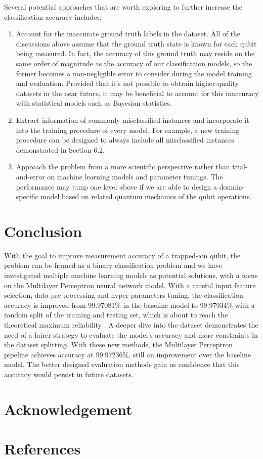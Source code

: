 \documentclass[letterpaper,twocolumn,10pt]{article}
\begin{document}
Several potential approaches that are worth exploring to further increase the classification accuracy includes:

\begin{enumerate}
    \item 
    Account for the inaccurate ground truth labels in the dataset. All of the discussions above assume that the ground truth state is known for each qubit being measured. In fact, the accuracy of this ground truth may reside on the same order of magnitude as the accuracy of our classification models, so the former becomes a non-negligible error to consider during the model training and evaluation. Provided that it's not possible to obtrain higher-quality datasets in the near future, it may be beneficial to account for this inaccuracy with statistical models such as Bayesian statistics. 

    \item 
    Extract information of commonly misclassified instances and incorporate it into the training procedure of every model. For example, a new training procedure can be designed to always include all misclassified instances demonstrated in Section 6.2.

    \item 
    Approach the problem from a more scientific perspective rather than trial-and-error on machine learning models and parameter tunings. The performance may jump one level above if we are able to design a domain-specific model based on related quantum mechanics of the qubit operations.

\end{enumerate}

\section{Conclusion}

With the goal to improve measurement accuracy of a trapped-ion qubit, the problem can be framed as a binary classification problem and we have investigated multiple machine learning models as potential solutions, with a focus on the Multilayer Perceptron neural network model. With a careful input feature selection, data pre-processing and hyper-parameters tuning, the classification accuracy is improved from 99.97081\% in the baseline model to 99.97934\% with a random split of the training and testing set, which is about to reach the theoretical maximum reliability . A deeper dive into the dataset demonstrates the need of a fairer strategy to evaluate the model's accuracy and more constraints in the dataset splitting. With these new methods, the Multilayer Perceptron pipeline achieves accuracy at 99.97236\%, still an improvement over the baseline model. The better designed evaluation methods gain us confidence that this accuracy would persist in future datasets.


\section{Acknowledgement}

\section{References}
\end{document}
